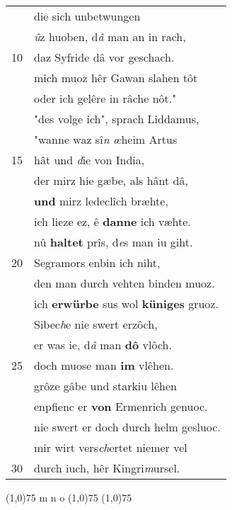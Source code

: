\documentclass[8pt,a4paper,notitlepage]{article}
\begin{document}
\begin{table}[ht]
\begin{minipage}[t]{0.5\linewidth}
\begin{tabular}{rl}
 & die sich unbetwungen\\ 
 & \textit{û}z huoben, d\textit{â} man an in rach,\\ 
10 & daz Syfride dâ vor geschach.\\ 
 & mich muoz hêr Gawan slahen tôt\\ 
 & oder ich gelêre in râche nôt."\\ 
 & "des volge ich", sprach Liddamus,\\ 
 & "wanne waz sî\textit{n} \textit{œ}heim Artus\\ 
15 & hât und \textit{d}ie von India,\\ 
 & der mirz hie gæbe, als  hânt dâ,\\ 
 & \textbf{und} mirz ledeclîch bræhte,\\ 
 & ich lieze ez, ê \textbf{danne} ich væhte.\\ 
 & nû \textbf{haltet} prîs, d\textit{e}s man iu giht.\\ 
20 & Segramors enbin ich niht,\\ 
 & den man durch vehten binden muoz.\\ 
 & ich \textbf{erwürbe} sus wol \textbf{küniges} gruoz.\\ 
 & Sibec\textit{h}e nie swert erzôch,\\ 
 & er was ie, d\textit{â} man \textbf{dô} vlôch.\\ 
25 & doch muose man \textbf{im} vlêhen.\\ 
 & grôze gâbe und starkiu lêhen\\ 
 & enpfienc er \textbf{von} Ermenrich genuoc.\\ 
 & nie swert er doch durch helm gesluoc.\\ 
 & mir wirt vers\textit{ch}ertet niemer vel\\ 
30 & durch iuch, hêr Kingri\textit{m}ursel.\\ 
\end{tabular}
\scriptsize
\line(1,0){75} \newline
m n o \newline
\line(1,0){75} \newline
\newline
\line(1,0){75} \newline

\end{minipage}
\end{table}
\end{document}
